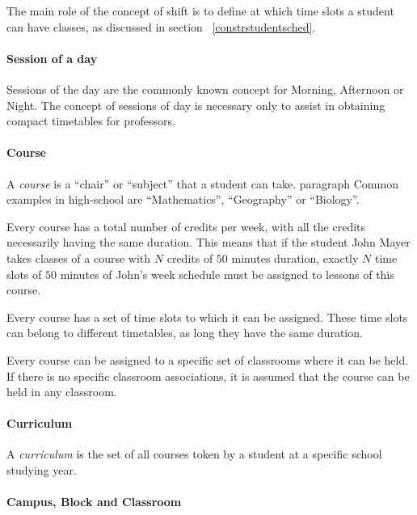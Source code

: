 The main role of the concept of shift is to define at which time slots a student can have classes, as discussed in section ~\ref{constrstudentsched}.


\paragraph{Session of a day}
\label{defsession}

Sessions of the day are the commonly known concept for Morning, Afternoon or Night. The concept of sessions of day is necessary only to assist in obtaining compact timetables for professors. 


\paragraph{Course}
\label{defcourse}

A \textit{course} is a ``chair'' or ``subject'' that a student can take.
paragraph
Common examples in high-school are ``Mathematics'', ``Geography'' or ``Biology''.

Every course has a total number of credits per week, with all the credits necessarily having the same duration. This means that if the student John Mayer takes classes of a course with $N$ credits of $50$ minutes duration, exactly $N$ time slots of $50$ minutes of John's week schedule must be assigned to lessons of this course.

Every course has a set of time slots to which it can be assigned. These time slots can belong to different timetables, as long they have the same duration.

Every course can be assigned to a specific set of classrooms where it can be held. If there is no specific classroom associations, it is assumed that the course can be held in any classroom.


\paragraph{Curriculum}
\label{defcurric}

A \textit{curriculum} is the set of all courses token by a student at a specific school studying year.


\paragraph{Campus, Block and Classroom}
\label{defclassroom}

